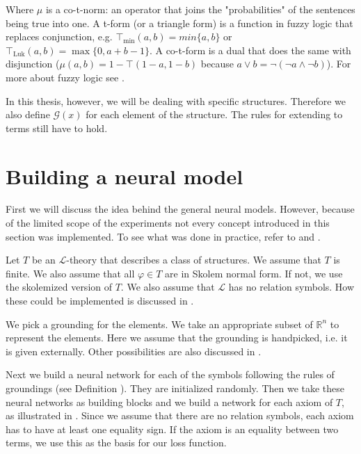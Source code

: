 Where $\mu$ is a co-t-norm: an operator that joins the "probabilities" of the sentences being true into one. A t-form (or a triangle form) is a function in fuzzy logic that replaces conjunction, e.g. $\top_{\min}(a,b)=min\{a,b\}$ or $\top_{\text{Luk}}(a,b)=\max\{0,a+b-1\}$. A co-t-form is a dual that does the same with disjunction ($\mu(a,b)=1-\top(1-a,1-b)$ because $a\vee b = \neg(\neg a\wedge \neg b)$). For more about fuzzy logic see \cite{fuzzy}.

In this thesis, however, we will be dealing with specific structures. Therefore we also define $\mathcal{G}(x)$ for each element of the structure. The rules for extending to terms still have to hold. 

\section{Building a neural model}

First we will discuss the idea behind the general neural models. However, because of the limited scope of the experiments not every concept introduced in this section was implemented. To see what was done in practice, refer to  and .

Let $T$ be an $\mathcal{L}$-theory that describes a class of structures. We assume that $T$ is finite. We also assume that all $\varphi\in T$ are in Skolem normal form. If not, we use the skolemized version of $T$. We also assume that $\mathcal{L}$ has no relation symbols. How these could be implemented is discussed in .

We pick a grounding for the elements. We take an appropriate subset of $\mathbb{R}^n$ to represent the elements. Here we assume that the grounding is handpicked, i.e. it is given externally. Other possibilities are also discussed in .

Next we build a neural network for each of the symbols following the rules of groundings (see Definition ). They are initialized randomly. Then we take these neural networks as building blocks and we build a network 
for each axiom of $T$, as illustrated in . Since we assume that there are no relation symbols, each axiom has to have at least one equality sign. If the axiom is an equality between two terms, we use this as the basis for our loss function.

